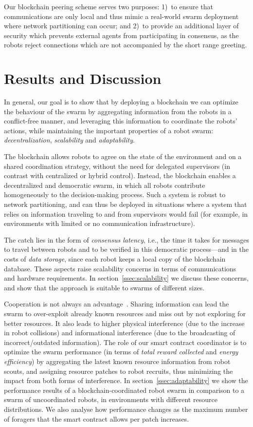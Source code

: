 \documentclass[runningheads]{llncs}
\begin{document}
Our blockchain peering scheme serves two purposes: 1)~to ensure that communications are only local and thus mimic a real-world swarm deployment where network partitioning can occur; and 2)~to provide an additional layer of security which prevents external agents from participating in consensus, as the robots reject connections which are not accompanied by the short range greeting.

\section{Results and Discussion}
\label{sec:results-and-discussion}

In general, our goal is to show that by deploying a blockchain we can optimize the behaviour of the swarm by aggregating information from the robots in a conflict-free manner, and leveraging this information to coordinate the robots' actions, while maintaining the important properties of a robot swarm: \emph{decentralization}, \emph{scalability} and \emph{adaptability}.

The blockchain allows robots to agree on the state of the environment and on a shared coordination strategy, without the need for delegated supervisors (in contrast with centralized or hybrid control). Instead, the blockchain enables a decentralized and democratic swarm, in which all robots contribute homogeneously to the decision-making process. Such a system is robust to network partitioning, and can thus be deployed in situations where a system that relies on information traveling to and from supervisors would fail (for example, in environments with limited or no communication infrastructure). 

The catch lies in the form of \emph{consensus latency}, i.e., the time it takes for messages to travel between robots and to be verified in this democratic process---and in the costs of \emph{data storage}, since each robot keeps a local copy of the blockchain database. These aspects raise scalability concerns in terms of communications and hardware requirements. In section~\ref{ssec:scalability} we discuss these concerns, and show that the approach is suitable to swarms of different sizes.

Cooperation is not always an advantage~\cite{pitonakova_icr_2018}. Sharing information can lead the swarm to over-exploit already known resources and miss out by not exploring for better resources. It also leads to higher physical interference (due to the increase in robot collisions) and informational interference (due to the broadcasting of incorrect/outdated information). The role of our smart contract coordinator is to optimize the swarm performance (in terms of \emph{total reward collected} and \emph{energy efficiency}) by aggregating the latest known resource information from robot scouts, and assigning resource patches to robot recruits, thus minimizing the impact from both forms of interference. In section~\ref{ssec:adaptability} we show the performance results of a blockchain-coordinated robot swarm in comparison to a swarm of uncoordinated robots, in environments with different resource distributions. We also analyse how performance changes as the maximum number of foragers that the smart contract allows per patch increases.
\end{document}
